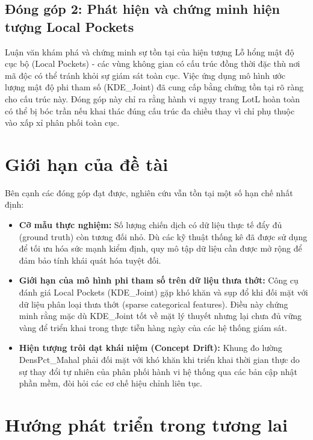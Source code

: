 \documentclass[../main.tex]{subfiles}
\begin{document}
\subsection*{Đóng góp 2: Phát hiện và chứng minh hiện tượng Local Pockets}
Luận văn khám phá và chứng minh sự tồn tại của hiện tượng Lỗ hổng mật độ cục bộ (Local Pockets) - các vùng không gian có cấu trúc đồng thời đặc thù nơi mã độc có thể tránh khỏi sự giám sát toàn cục. Việc ứng dụng mô hình ước lượng mật độ phi tham số (KDE\_Joint) đã cung cấp bằng chứng tồn tại rõ ràng cho cấu trúc này. Đóng góp này chỉ ra rằng hành vi ngụy trang LotL hoàn toàn có thể bị bóc trần nếu khai thác đúng cấu trúc đa chiều thay vì chỉ phụ thuộc vào xấp xỉ phân phối toàn cục.

\section*{Giới hạn của đề tài}
\label{section:5.3}

Bên cạnh các đóng góp đạt được, nghiên cứu vẫn tồn tại một số hạn chế nhất định:
\begin{itemize}
    \item \textbf{Cỡ mẫu thực nghiệm:} Số lượng chiến dịch có dữ liệu thực tế đẩy đủ (ground truth) còn tương đối nhỏ. Dù các kỹ thuật thống kê đã được sử dụng để tối ưu hóa sức mạnh kiểm định, quy mô tập dữ liệu cần được mở rộng để đảm bảo tính khái quát hóa tuyệt đối.
    \item \textbf{Giới hạn của mô hình phi tham số trên dữ liệu thưa thớt:} Công cụ đánh giá Local Pockets (KDE\_Joint) gặp khó khăn và sụp đổ khi đối mặt với dữ liệu phân loại thưa thớt (sparse categorical features). Điều này chứng minh rằng mặc dù KDE\_Joint tốt về mặt lý thuyết nhưng lại chưa đủ vững vàng để triển khai trong thực tiễn hàng ngày của các hệ thống giám sát.
    \item \textbf{Hiện tượng trôi dạt khái niệm (Concept Drift):} Khung đo lường DensPct\_Mahal phải đối mặt với khó khăn khi triển khai thời gian thực do sự thay đổi tự nhiên của phân phối hành vi hệ thống qua các bản cập nhật phần mềm, đòi hỏi các cơ chế hiệu chỉnh liên tục.
\end{itemize}

\section*{Hướng phát triển trong tương lai}
\label{section:5.4}
\end{document}
